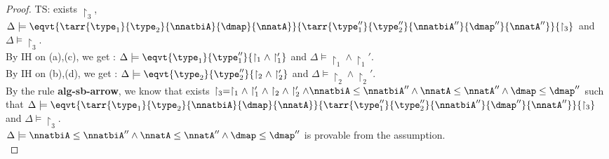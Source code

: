 \begin{proof}
 TS: exists $\restriction_3$, $ \Delta \models \eqvt{ \tarr{\type_1}{\type_2}{\nnatbiA}{\dmap}{\nnatA}   }{ \tarr{\type_1''}{\type_2''}{\nnatbiA''}{\dmap''}{\nnatA''}
  }{\restriction_3 } $ and $ \Delta \models \restriction_3 $.\\
  By IH on (a),(c), we get : $ \Delta \models \eqvt{ \type_1  }{ \type_1'' 
  }{\restriction_1 \land \restriction_1' } $ and $ \Delta \models \restriction_1 \land \restriction_1'$.\\
  By IH on (b),(d), we get : $ \Delta \models \eqvt{ \type_2  }{ \type_2'' 
  }{\restriction_2 \land \restriction_2' } $ and $ \Delta \models \restriction_2 \land \restriction_2'$.\\
  By the rule \textbf{alg-sb-arrow}, we know that exists $\restriction_3 = \restriction_1 \land \restriction_1' \land \restriction_2 \land \restriction_2' \land \nnatbiA \leq \nnatbiA''
    \land \nnatA \leq \nnatA'' \land \dmap \leq \dmap'' $ such that $ \Delta \models \eqvt{ \tarr{\type_1}{\type_2}{\nnatbiA}{\dmap}{\nnatA} }{ \tarr{\type_1''}{\type_2''}{\nnatbiA''}{\dmap''}{\nnatA''}
  }{\restriction_3 } $ and $ \Delta \models \restriction_3 $.\\
  $\Delta \models \nnatbiA \leq \nnatbiA''
    \land \nnatA \leq \nnatA'' \land \dmap \leq \dmap''$ is provable from the assumption.\\
    

\end{proof}
